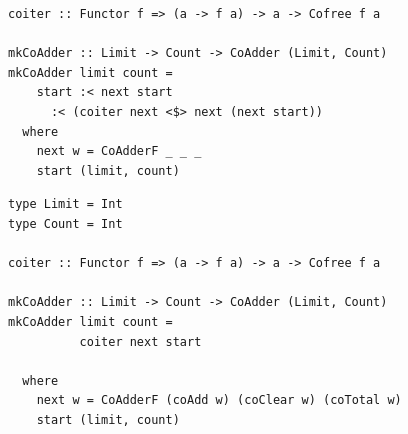 \documentclass{beamer}
\begin{document}
\begin{frame}[fragile]
\begin{overprint}
\begin{verbatim}
coiter :: Functor f => (a -> f a) -> a -> Cofree f a

mkCoAdder :: Limit -> Count -> CoAdder (Limit, Count)
mkCoAdder limit count =
    start :< next start
      :< (coiter next <$> next (next start))
  where
    next w = CoAdderF _ _ _
    start (limit, count)
  \end{verbatim}
  \begin{verbatim}
type Limit = Int
type Count = Int

coiter :: Functor f => (a -> f a) -> a -> Cofree f a

mkCoAdder :: Limit -> Count -> CoAdder (Limit, Count)
mkCoAdder limit count =
          coiter next start

  where
    next w = CoAdderF (coAdd w) (coClear w) (coTotal w)
    start (limit, count)
  \end{verbatim}
  \end{overprint}
\end{frame}
\end{document}
